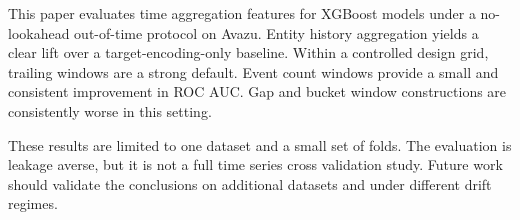 This paper evaluates time aggregation features for XGBoost models under a no-lookahead out-of-time protocol on Avazu.
Entity history aggregation yields a clear lift over a target-encoding-only baseline.
Within a controlled design grid, trailing windows are a strong default.
Event count windows provide a small and consistent improvement in ROC AUC.
Gap and bucket window constructions are consistently worse in this setting.

These results are limited to one dataset and a small set of folds.
The evaluation is leakage averse, but it is not a full time series cross validation study.
Future work should validate the conclusions on additional datasets and under different drift regimes.
